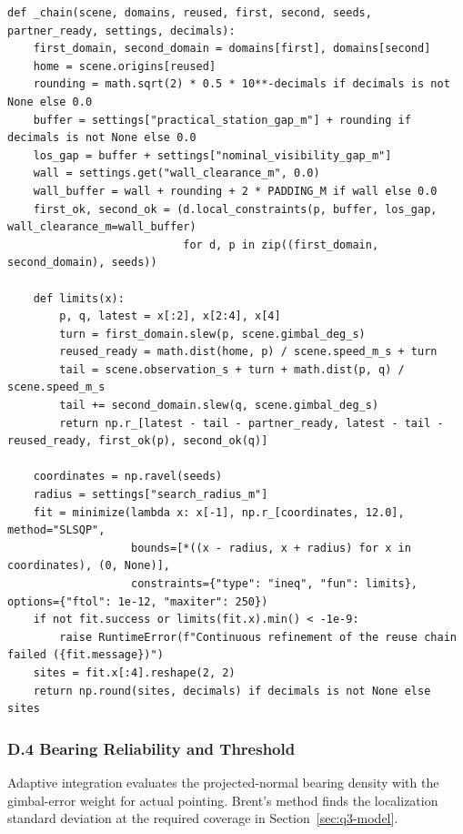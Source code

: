 \documentclass{swmcmthesis}
\begin{document}
\noindent{}
\begin{lstlisting}
def _chain(scene, domains, reused, first, second, seeds, partner_ready, settings, decimals):
    first_domain, second_domain = domains[first], domains[second]
    home = scene.origins[reused]
    rounding = math.sqrt(2) * 0.5 * 10**-decimals if decimals is not None else 0.0
    buffer = settings["practical_station_gap_m"] + rounding if decimals is not None else 0.0
    los_gap = buffer + settings["nominal_visibility_gap_m"]
    wall = settings.get("wall_clearance_m", 0.0)
    wall_buffer = wall + rounding + 2 * PADDING_M if wall else 0.0
    first_ok, second_ok = (d.local_constraints(p, buffer, los_gap, wall_clearance_m=wall_buffer)
                           for d, p in zip((first_domain, second_domain), seeds))

    def limits(x):
        p, q, latest = x[:2], x[2:4], x[4]
        turn = first_domain.slew(p, scene.gimbal_deg_s)
        reused_ready = math.dist(home, p) / scene.speed_m_s + turn
        tail = scene.observation_s + turn + math.dist(p, q) / scene.speed_m_s
        tail += second_domain.slew(q, scene.gimbal_deg_s)
        return np.r_[latest - tail - partner_ready, latest - tail - reused_ready, first_ok(p), second_ok(q)]

    coordinates = np.ravel(seeds)
    radius = settings["search_radius_m"]
    fit = minimize(lambda x: x[-1], np.r_[coordinates, 12.0], method="SLSQP",
                   bounds=[*((x - radius, x + radius) for x in coordinates), (0, None)],
                   constraints={"type": "ineq", "fun": limits}, options={"ftol": 1e-12, "maxiter": 250})
    if not fit.success or limits(fit.x).min() < -1e-9:
        raise RuntimeError(f"Continuous refinement of the reuse chain failed ({fit.message})")
    sites = fit.x[:4].reshape(2, 2)
    return np.round(sites, decimals) if decimals is not None else sites
\end{lstlisting}

\subsubsection*{D.4 Bearing Reliability and Threshold}

Adaptive integration evaluates the projected-normal bearing density with the gimbal-error weight for actual pointing. Brent's method finds the localization standard deviation at the required coverage in Section~\ref{sec:q3-model}.
\end{document}
